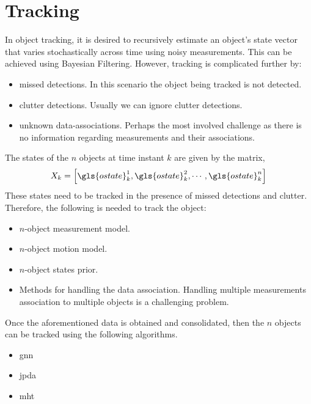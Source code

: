\documentclass[a4paper]{article}
\begin{document}
\section{Tracking}
In object tracking, it is desired to recursively estimate an object's state vector that varies stochastically across time using noisy measurements. This can be achieved using Bayesian Filtering. However, tracking is complicated further by:
\begin{itemize}
	\item missed detections. In this scenario the object being tracked is not detected.
	\item clutter detections. Usually we can ignore clutter detections.
	\item unknown data-associations. Perhaps the most involved challenge as there is no information regarding measurements and their associations.
\end{itemize}
The states of the $n$ objects at time instant $k$ are given by the matrix,
$$X_k= \left[\gls{ostate}_k^1,\gls{ostate}_k^2,\cdots,\gls{ostate}_k^n\right]$$
These states need to be tracked in the presence of missed detections and clutter.
Therefore, the following is needed to track the object:
\begin{itemize}
	\item $n$-object measurement model.
	\item $n$-object motion model.
	\item $n$-object states prior.
	\item Methods for handling the data association. Handling multiple measurements association to multiple objects is a challenging problem. 
\end{itemize}
Once the aforementioned data is obtained and consolidated, then the $n$ objects can be tracked using the following algorithms.
\begin{itemize}
	\item \acrfull{gnn}
	\item \acrfull{jpda}
	\item \acrfull{mht}
\end{itemize}
\end{document}
